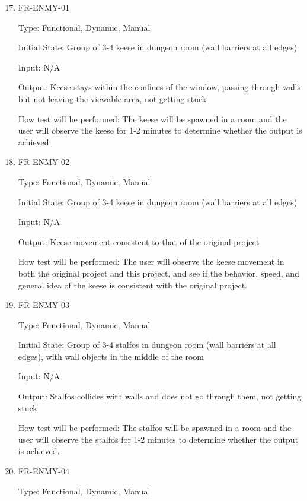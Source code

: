 \documentclass[12pt, titlepage]{article}
\begin{document}
\begin{enumerate}
	\setcounter{enumi}{16}	
	
\item{FR-ENMY-01\\}

Type: Functional, Dynamic, Manual

Initial State: Group of 3-4 keese in dungeon room (wall barriers at all edges)

Input: N/A

Output: Keese stays within the confines of the window, passing through walls but not leaving the viewable area, not getting stuck

How test will be performed: The keese will be spawned in a room and the user will observe the keese for 1-2 minutes to determine whether the output is achieved.

\item{FR-ENMY-02\\}

Type: Functional, Dynamic, Manual

Initial State: Group of 3-4 keese in dungeon room (wall barriers at all edges)

Input: N/A

Output: Keese movement consistent to that of the original project

How test will be performed: The user will observe the keese movement in both the original project and this project, and see if the behavior, speed, and general idea of the keese is consistent with the original project.

\item{FR-ENMY-03\\}

Type: Functional, Dynamic, Manual

Initial State: Group of  3-4 stalfos in dungeon room (wall barriers at all edges), with wall objects in the middle of the room

Input: N/A

Output: Stalfos collides with walls and does not go through them, not getting stuck

How test will be performed: The stalfos will be spawned in a room and the user will observe the stalfos for 1-2 minutes to determine whether the output is achieved.

\item{FR-ENMY-04\\}

Type: Functional, Dynamic, Manual


\end{enumerate}
\end{document}
